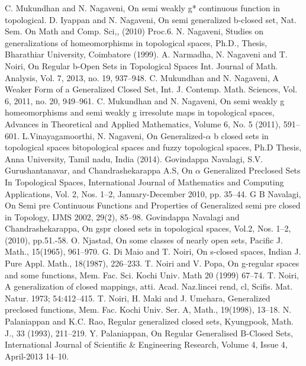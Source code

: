 \begin{thebibliography}{99}
 C. Mukundhan and N. Nagaveni, On semi weakly g* continuous function in topological. 
 D. Iyappan and N. Nagaveni, On semi generalized b-closed set, Nat. Sem. On Math and Comp. Sci,, (2010) Proc.6.
 N. Nagaveni, Studies on generalizations of homeomorphisms in topological spaces, Ph.D., Thesis, Bharathiar University, Coimbatore (1999).
 A. Narmadha, N. Nagaveni and T. Noiri, On Regular b-Open Sets in Topological Spaces Int. Journal of Math. Analysis, Vol. 7, 2013, no. 19, 937--948.
 C. Mukundhan and N. Nagaveni, A Weaker Form of a Generalized Closed Set, Int. J. Contemp. Math. Sciences, Vol. 6, 2011, no. 20, 949--961.
 C. Mukundhan and N. Nagaveni, On semi weakly g homeomorphisms and semi weakly g irresolute maps in topological spaces, Advances in Theoretical and Applied Mathematics, Volume 6, No. 5 (2011), 591--601.
 L.Vinayagamoorthi, N. Nagaveni, On Generalized-$\alpha$ b closed sets in topological spaces bitopological spaces and fuzzy topological spaces, Ph.D Thesis, Anna University, Tamil nadu, India (2014).
 Govindappa Navalagi, S.V. Gurushantanavar, and Chandrashekarappa A.S,  On $\alpha$ Generalized Preclosed Sets In Topological Spaces, International Journal of Mathematics and Computing Applications, Vol. 2, Nos. 1--2, January-December 2010, pp. 35--44.
 G B Navalagi, On Semi pre Continuous Functions and Properties of Generalized semi pre closed in Topology, IJMS 2002, 29(2), 85--98.
 Govindappa Navalagi and Chandrashekarappa, On gspr closed sets in topological spaces, Vol.2, Nos. 1--2, (2010), pp.51.-58.
 O. Njastad, On some classes of nearly open sets,  Pacific J. Math., 15(1965), 961--970.
 G. Di Maio and T. Noiri, On s-closed spaces, Indian J. Pure Appl. Math., 18(1987), 226--233.
 T. Noiri and V. Popa, On g-regular spaces and some functions, Mem. Fac. Sci. Kochi Univ. Math 20 (1999) 67--74.
 T. Noiri, A generalization of closed mappings, atti. Acad. Naz.lincei rend, cl, Scifis. Mat. Natur. 1973; 54:412--415.
 T. Noiri, H. Maki and J. Umehara, Generalized preclosed functions, Mem. Fac. Kochi Univ. Ser. A, Math., 19(1998), 13--18.
 N. Palaniappan and K.C. Rao, Regular generalized closed sets, Kyungpook, Math. J., 33 (1993), 211--219.
 Y. Palaniappan, On Regular Generalised B-Closed Sets,  International Journal of 	Scientific \& Engineering Research, Volume 4, Issue 4, April-2013 14--10.

\end{thebibliography}
